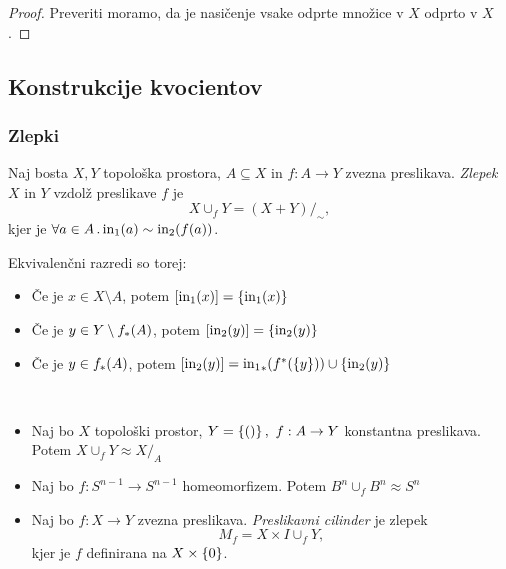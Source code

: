 \begin{proof}
    Preveriti moramo, da je nasičenje vsake odprte množice v \(X\) odprto v \(X\).
\end{proof}

\subsection{Konstrukcije kvocientov}

\newpage
\subsubsection*{Zlepki}
\begin{definicija}
    Naj bosta \(X, Y\) topološka prostora, \(A \subseteq X\) in \(f: A \to Y\) zvezna preslikava. \emph{Zlepek} \(X\) in \(Y\) vzdolž preslikave \(f\) je 
    \[X \cup_f Y = (X + Y)/_\sim,\]
    kjer je \(\forall a \in A \,.\, \text{in}_1(a) \sim \text{in}_2(f(a))\).
\end{definicija}

Ekvivalenčni razredi so torej:
\begin{itemize}
    \item Če je \(x \in X \setminus A\), potem \([\text{in}_1(x)] = \left\{\text{in}_1(x)\right\}\)
    \item Če je \(y \in Y \setminus f_{*}(A)\), potem \([\text{in}_2(y)] = \left\{\text{in}_2(y)\right\}\)
    \item Če je \(y \in f_{*}(A)\), potem \([\text{in}_2(y)] = {\text{in}_1}_{*}(f^{*}(\left\{y\right\})) \cup \left\{\text{in}_2(y)\right\}\)
\end{itemize} 

\begin{primer}
    \ 
    \begin{itemize}
        \item Naj bo \(X\) topološki prostor, \(Y = \left\{()\right\}, \ f: A \to Y\) konstantna preslikava. Potem \(X \cup_f Y \approx X /_A\)
        \item Naj bo \(f: S^{n-1} \to S^{n-1}\) homeomorfizem. Potem \(B^n \cup_f B^n \approx S^n\)
        \item Naj bo \(f: X \to Y\) zvezna preslikava. \emph{Preslikavni cilinder} je zlepek 
        \[M_f = X \times I \cup_f Y,\]
        kjer je \(f\) definirana na \(X \times \left\{0\right\}\).
    \end{itemize}
\end{primer}

